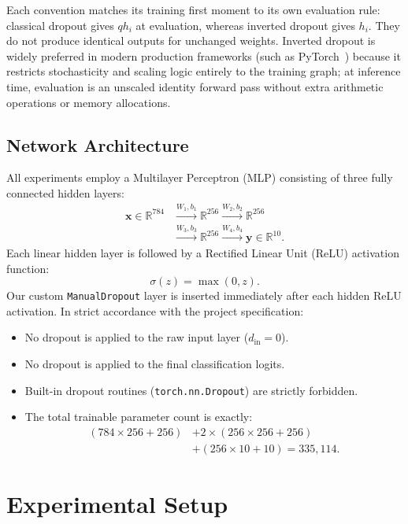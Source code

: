 \documentclass[conference]{IEEEtran}
\begin{document}
Each convention matches its training first moment to its own evaluation rule: classical dropout gives $q h_i$ at evaluation, whereas inverted dropout gives $h_i$. They do not produce identical outputs for unchanged weights. Inverted dropout is widely preferred in modern production frameworks (such as PyTorch~\cite{pytorch_dropout}) because it restricts stochasticity and scaling logic entirely to the training graph; at inference time, evaluation is an unscaled identity forward pass without extra arithmetic operations or memory allocations.

\subsection{Network Architecture}
All experiments employ a Multilayer Perceptron (MLP) consisting of three fully connected hidden layers:
\begin{align}
\mathbf{x} \in \mathbb{R}^{784} &\xrightarrow{W_1, b_1} \mathbb{R}^{256} \xrightarrow{W_2, b_2} \mathbb{R}^{256} \nonumber \\
&\xrightarrow{W_3, b_3} \mathbb{R}^{256} \xrightarrow{W_4, b_4} \mathbf{y} \in \mathbb{R}^{10}.
\end{align}
Each linear hidden layer is followed by a Rectified Linear Unit (ReLU) activation function:
\begin{equation}
\sigma(z) = \max(0, z).
\end{equation}
Our custom \texttt{ManualDropout} layer is inserted immediately after each hidden ReLU activation. In strict accordance with the project specification:
\begin{itemize}
\item No dropout is applied to the raw input layer ($d_{\text{in}} = 0$).
\item No dropout is applied to the final classification logits.
\item Built-in dropout routines (\texttt{torch.nn.Dropout}) are strictly forbidden.
\item The total trainable parameter count is exactly:
\begin{align}
(784 \times 256 + 256) &+ 2 \times (256 \times 256 + 256) \nonumber \\
&+ (256 \times 10 + 10) = 335{,}114.
\end{align}
\end{itemize}

\section{Experimental Setup}
\end{document}

